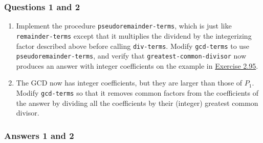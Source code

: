 \documentclass[final,fleqn,titlepage,twoside]{article}
\begin{document}
\subsubsection{Questions 1 and 2}
\label{sec:orge8662c5}

\begin{enumerate}
\item Implement the procedure \texttt{pseudoremainder-terms}, which is just like
\texttt{remainder-terms} except that it multiplies the dividend by the
integerizing factor described above before calling \texttt{div-terms}.
Modify \texttt{gcd-terms} to use \texttt{pseudoremainder-terms}, and
verify that \texttt{greatest-common-divisor} now produces an answer with
integer coefficients on the example in \hyperref[sec:org70890f0]{Exercise 2.95}.

\item The GCD now has integer coefficients, but they are larger than those of
\(P_1\). Modify \texttt{gcd-terms} so that it removes common factors from
the coefficients of the answer by dividing all the coefficients by their
(integer) greatest common divisor.
\end{enumerate}

\subsubsection{Answers 1 and 2}
\label{sec:org17813f8}
\end{document}
